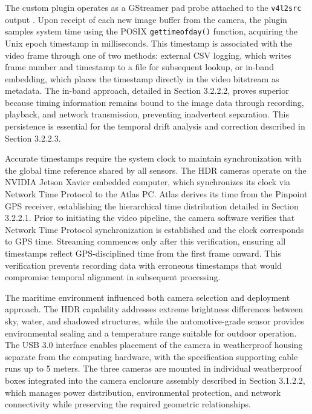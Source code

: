 \documentclass{erauthesis}
\begin{document}
The custom plugin operates as a GStreamer pad probe attached to the \texttt{v4l2src} output \cite{thompson2023}.
Upon receipt of each new image buffer from the camera, the plugin samples system time using the POSIX \texttt{gettimeofday()} function, acquiring the Unix epoch timestamp in milliseconds.
This timestamp is associated with the video frame through one of two methods: external CSV logging, which writes frame number and timestamp to a file for subsequent lookup, or in-band embedding, which places the timestamp directly in the video bitstream as metadata.
The in-band approach, detailed in Section 3.2.2.2, proves superior because timing information remains bound to the image data through recording, playback, and network transmission, preventing inadvertent separation.
This persistence is essential for the temporal drift analysis and correction described in Section 3.2.2.3.

Accurate timestamps require the system clock to maintain synchronization with the global time reference shared by all sensors.
The \ac{HDR} cameras operate on the NVIDIA Jetson Xavier embedded computer, which synchronizes its clock via Network Time Protocol to the Atlas PC.
Atlas derives its time from the Pinpoint \ac{GPS} receiver, establishing the hierarchical time distribution detailed in Section 3.2.2.1.
Prior to initiating the video pipeline, the camera software verifies that Network Time Protocol synchronization is established and the clock corresponds to \ac{GPS} time.
Streaming commences only after this verification, ensuring all timestamps reflect \ac{GPS}-disciplined time from the first frame onward.
This verification prevents recording data with erroneous timestamps that would compromise temporal alignment in subsequent processing.

The maritime environment influenced both camera selection and deployment approach.
The \ac{HDR} capability addresses extreme brightness differences between sky, water, and shadowed structures, while the automotive-grade sensor provides environmental sealing and a temperature range suitable for outdoor operation.
The USB 3.0 interface enables placement of the camera in weatherproof housing separate from the computing hardware, with the specification supporting cable runs up to 5 meters.
The three cameras are mounted in individual weatherproof boxes integrated into the camera enclosure assembly described in Section 3.1.2.2, which manages power distribution, environmental protection, and network connectivity while preserving the required geometric relationships.
\end{document}
